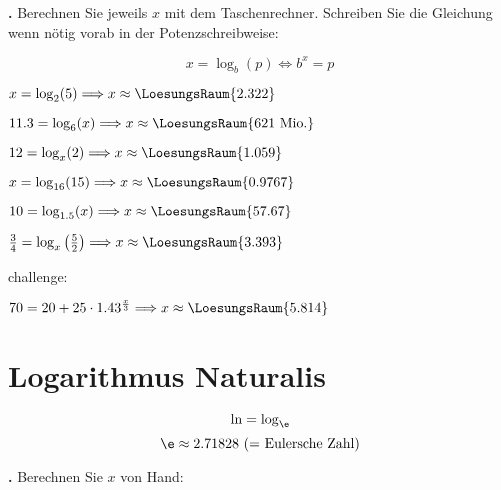 \newpage

\textbf{\bbwAufgabenNummer{}.}
Berechnen Sie jeweils $x$ mit dem Taschenrechner. Schreiben Sie die
Gleichung wenn nötig vorab in der Potenzschreibweise:

$$x=\log_b(p) \Longleftrightarrow b^x=p$$

\begin{bbwAufgabenBlock}
\item $x=\log_2(5) \Longrightarrow x \approx    \LoesungsRaum{2.322}$
\item $11.3 = \log_6(x) \Longrightarrow x \approx    \LoesungsRaum{621 \text{ Mio.}}$
\item $12 = \log_x(2) \Longrightarrow x \approx    \LoesungsRaum{1.059}$
\item $x = \log_{16}(15)  \Longrightarrow x \approx    \LoesungsRaum{0.9767}$
\item $10 = \log_{1.5}(x)  \Longrightarrow x \approx    \LoesungsRaum{57.67}$
\item $\frac34 = \log_{x}\left(\frac52\right)  \Longrightarrow x \approx    \LoesungsRaum{3.393}$\\

\noTRAINER{\newpage}

challenge:

\item $70=20 + 25 \cdot{} 1.43^{\frac{x}3}  \Longrightarrow x \approx    \LoesungsRaum{5.814}$

\end{bbwAufgabenBlock}

\newpage

\section{Logarithmus Naturalis}

$$\ln = \log_{\e}$$
$$\e \approx 2.71828 \text{ (= Eulersche Zahl)}$$



\textbf{\bbwAufgabenNummer{}.}
Berechnen Sie $x$ von Hand:

